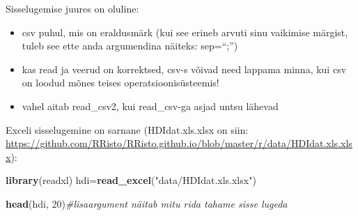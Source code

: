 \documentclass[]{article}
\newenvironment{Shaded}{\begin{snugshade}}{\end{snugshade}}
\newcommand{\KeywordTok}[1]{\textcolor[rgb]{0.13,0.29,0.53}{\textbf{#1}}}
\newcommand{\DecValTok}[1]{\textcolor[rgb]{0.00,0.00,0.81}{#1}}
\newcommand{\StringTok}[1]{\textcolor[rgb]{0.31,0.60,0.02}{#1}}
\newcommand{\CommentTok}[1]{\textcolor[rgb]{0.56,0.35,0.01}{\textit{#1}}}
\newcommand{\NormalTok}[1]{#1}
\providecommand{\tightlist}{%
  \setlength{\itemsep}{0pt}\setlength{\parskip}{0pt}}
\begin{document}
Sisselugemise juures on oluline:

\begin{itemize}
\tightlist
\item
  csv puhul, mis on eraldusmärk (kui see erineb arvuti sinu vaikimise
  märgist, tuleb see ette anda argumendina näiteks: sep=``;'')
\item
  kas read ja veerud on korrektsed, csv-s võivad need lappama minna, kui
  csv on loodud mõnes teises operatsioonisüsteemis!
\item
  vahel aitab read\_csv2, kui read\_csv-ga asjad untsu lähevad
\end{itemize}

Exceli sisselugemine on sarnane (HDIdat.xls.xlsx on siin:
\url{https://github.com/RRisto/RRisto.github.io/blob/master/r/data/HDIdat.xls.xlsx}):

\begin{Shaded}
\begin{Highlighting}[]
\KeywordTok{library}\NormalTok{(readxl)}
\NormalTok{hdi=}\KeywordTok{read_excel}\NormalTok{(}\StringTok{"data/HDIdat.xls.xlsx"}\NormalTok{)}
\end{Highlighting}
\end{Shaded}

\begin{Shaded}
\begin{Highlighting}[]
\KeywordTok{head}\NormalTok{(hdi, }\DecValTok{20}\NormalTok{)}\CommentTok{#lisaargument näitab mitu rida tahame sisse lugeda}
\end{Highlighting}
\end{Shaded}
\end{document}
